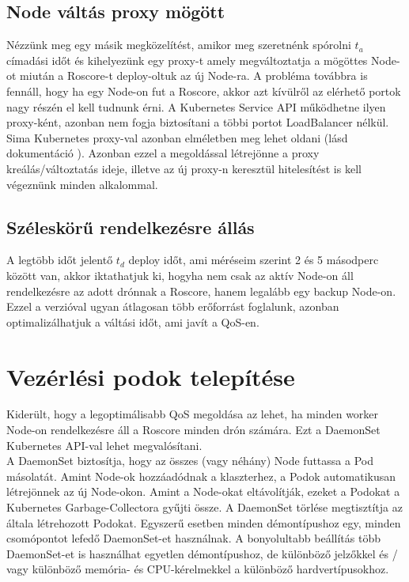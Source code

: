 \subsection{Node váltás proxy mögött}
Nézzünk meg egy másik megközelítést, amikor meg szeretnénk spórolni $t_a$ címadási időt és kihelyezünk egy proxy-t amely megváltoztatja a mögöttes Node-ot miután a Roscore-t deploy-oltuk az új Node-ra. A probléma továbbra is fennáll, hogy ha egy Node-on fut a Roscore, akkor azt kívülről az elérhető portok nagy részén el kell tudnunk érni. A Kubernetes Service API működhetne ilyen proxy-ként, azonban nem fogja biztosítani a többi portot LoadBalancer nélkül. Sima Kubernetes proxy-val azonban elméletben meg lehet oldani (lásd dokumentáció \cite{proxy}). Azonban ezzel a megoldással létrejönne a proxy kreálás/változtatás ideje, illetve az új proxy-n keresztül hitelesítést is kell végeznünk minden alkalommal. 

\subsection{Széleskörű rendelkezésre állás}
A legtöbb időt jelentő $t_d$ deploy időt, ami méréseim szerint 2 és 5 másodperc között van, akkor iktathatjuk ki, hogyha nem csak az aktív Node-on áll rendelkezésre az adott drónnak a Roscore, hanem legalább egy backup Node-on. Ezzel a verzióval ugyan átlagosan több erőforrást foglalunk, azonban optimalizálhatjuk a váltási időt, ami javít a QoS-en.

\section{Vezérlési podok telepítése}
Kiderült, hogy a legoptimálisabb QoS megoldása az lehet, ha minden worker Node-on rendelkezésre áll a Roscore minden drón számára. Ezt a DaemonSet Kubernetes API-val lehet megvalósítani. \\

\noindent
A DaemonSet biztosítja, hogy az összes (vagy néhány) Node futtassa a Pod másolatát. Amint  Node-ok hozzáadódnak a klaszterhez, a Podok automatikusan létrejönnek az új Node-okon. Amint a Node-okat eltávolítják, ezeket a Podokat a Kubernetes Garbage-Collectora gyűjti össze. A DaemonSet törlése megtisztítja az általa létrehozott Podokat. Egyszerű esetben minden démontípushoz egy, minden csomópontot lefedő DaemonSet-et használnak. A bonyolultabb beállítás több DaemonSet-et is használhat egyetlen démontípushoz, de különböző jelzőkkel és / vagy különböző memória- és CPU-kérelmekkel a különböző hardvertípusokhoz. \cite{daemonset} \\

